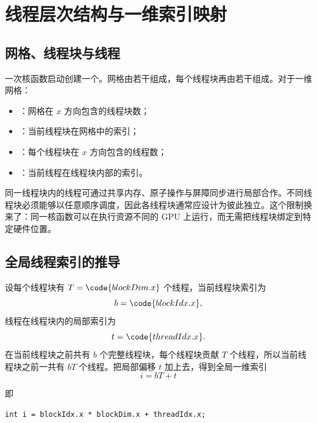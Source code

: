 \section{线程层次结构与一维索引映射}

\subsection{网格、线程块与线程}

一次核函数启动创建一个。网格由若干组成，每个线程块再由若干组成。对于一维网格：

\begin{itemize}
  \item {}：网格在 $x$ 方向包含的线程块数；
  \item {}：当前线程块在网格中的索引；
  \item {}：每个线程块在 $x$ 方向包含的线程数；
  \item {}：当前线程在线程块内部的索引。
\end{itemize}


同一线程块内的线程可通过共享内存、原子操作与屏障同步进行局部合作。不同线程块必须能够以任意顺序调度，因此各线程块通常应设计为彼此独立。这个限制换来了：同一核函数可以在执行资源不同的 GPU 上运行，而无需把线程块绑定到特定硬件位置。

\subsection{全局线程索引的推导}

设每个线程块有 $T=\code{blockDim.x}$ 个线程，当前线程块索引为
\[
b=\code{blockIdx.x},
\]
线程在线程块内的局部索引为
\[
t=\code{threadIdx.x}.
\]
在当前线程块之前共有 $b$ 个完整线程块，每个线程块贡献 $T$ 个线程，所以当前线程块之前一共有 $bT$ 个线程。把局部偏移 $t$ 加上去，得到全局一维索引
\[
\boxed{i=bT+t}
\]
\par\noindent\begin{minipage}{\linewidth}
即
\begin{lstlisting}[style=cuda,numbers=none]
int i = blockIdx.x * blockDim.x + threadIdx.x;
\end{lstlisting}
\end{minipage}\par

